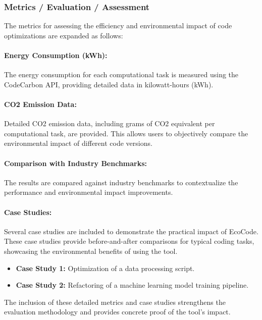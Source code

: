 \documentclass[conference,compsoc]{IEEEtran}
\begin{document}
\subsubsection{Metrics / Evaluation / Assessment}
\label{sec:metrics_evaluation}

The metrics for assessing the efficiency and environmental impact of code optimizations are expanded as follows:

\paragraph{Energy Consumption (kWh):}
The energy consumption for each computational task is measured using the CodeCarbon API, providing detailed data in kilowatt-hours (kWh).

\paragraph{CO2 Emission Data:}
Detailed CO2 emission data, including grams of CO2 equivalent per computational task, are provided. This allows users to objectively compare the environmental impact of different code versions.

\paragraph{Comparison with Industry Benchmarks:}
The results are compared against industry benchmarks to contextualize the performance and environmental impact improvements.

\paragraph{Case Studies:}
Several case studies are included to demonstrate the practical impact of EcoCode. These case studies provide before-and-after comparisons for typical coding tasks, showcasing the environmental benefits of using the tool.

\begin{itemize}
	\item \textbf{Case Study 1:} Optimization of a data processing script.
	\item \textbf{Case Study 2:} Refactoring of a machine learning model training pipeline.
\end{itemize}

The inclusion of these detailed metrics and case studies strengthens the evaluation methodology and provides concrete proof of the tool's impact.
\end{document}
